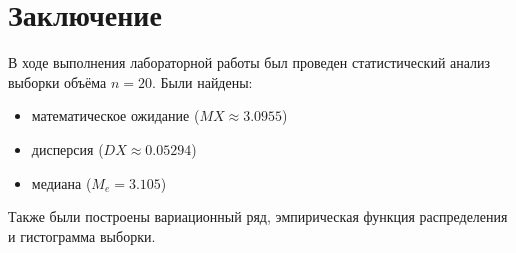 \section{Заключение}

В ходе выполнения лабораторной работы был проведен статистический анализ выборки объёма \( n=20 \). Были найдены:
\begin{itemize}
    \item математическое ожидание ($MX\approx 3.0955$)
    \item дисперсия ($DX\approx 0.05294$)
    \item медиана ($M_e=3.105$)
\end{itemize}

Также были построены вариационный ряд, эмпирическая функция распределения и гистограмма выборки. 